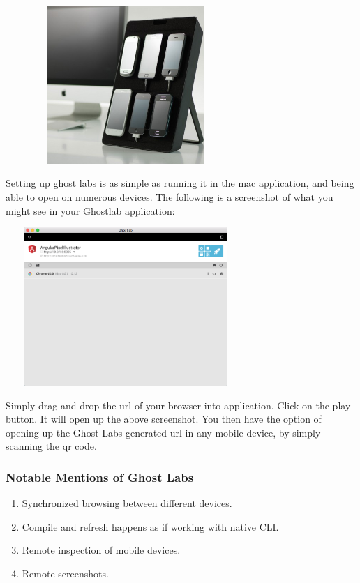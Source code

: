 \includegraphics[width=9.1cm, height=6cm]{pwa/pwa-toolset-physical-devices/device-lab-stand}

Setting up ghost labs is as simple as running it in the mac application, and
being able to open on numerous devices. The following is a screenshot of what
you might see in your Ghostlab application:


\includegraphics[width=9.1cm, height=6cm]{pwa/pwa-toolset-physical-devices/ghostlabs-screenshot}

Simply drag and drop the url of your browser into application. Click on the play
button. It will open up the above screenshot. You then have the option of
opening up the Ghost Labs generated url in any mobile device, by simply
scanning the qr code.

\subsubsection{ Notable Mentions of Ghost Labs }
\begin{enumerate}
  \item Synchronized browsing between different devices.
  \item Compile and refresh happens as if working with native CLI.
  \item Remote inspection of mobile devices.
  \item Remote screenshots.
\end{enumerate}

